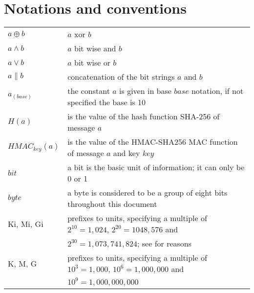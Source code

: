 \section{Notations and conventions}
\begin{tabular}{ll}
$a \oplus b$ & $a$ xor $b$ \\
$a \wedge b$ & $a$ bit wise and $b$ \\
$a \vee b$ & $a$ bit wise or $b$ \\
$a \parallel b$ & concatenation of the bit strings $a$ and $b$ \\
$a_{(base)}$ & the constant $a$ is given in base $base$ notation, if not specified the base is 10\\
$H(a)$ & is the value of the hash function SHA-256 of message $a$ \\
$HMAC_{key}(a)$ & is the value of the HMAC-SHA256 MAC function of message $a$ and key $key$ \\
$bit$ & a bit is the basic unit of information; it can only be 0 or 1 \\
$byte$ & a byte is considered to be a group of eight bits throughout this document \\
Ki, Mi, Gi & prefixes to units, specifying a multiple of $2^{10} = 1,024$, $2^{20} = 1048,576$ and\\ & $2^{30} = 1,073,741,824$; see \cite{IEC60027-2} for reasons \\
K, M, G & prefixes to units, specifying a multiple of $10^3 = 1,000$, $10^6 = 1,000,000$ and\\ & $10^9=1,000,000,000$ \\ 
\end{tabular}